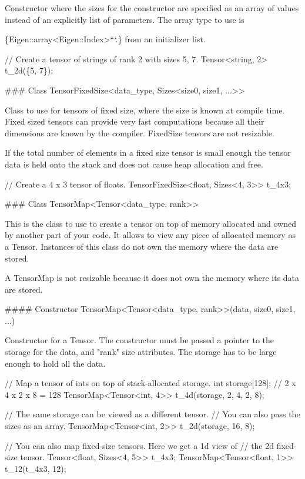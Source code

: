 Constructor where the sizes for the constructor are specified as an array of values instead of an explicitly list of parameters. The array type to use is 
\begin{DoxyCode}
\{Eigen::array<Eigen::Index>```.\}
from an initializer list.

    // Create a tensor of strings of rank 2 with sizes 5, 7.
    Tensor<string, 2> t\_2d(\{5, 7\});


### Class TensorFixedSize<data\_type, Sizes<size0, size1, ...>>

Class to use for tensors of fixed size, where the size is known at compile
time.  Fixed sized tensors can provide very fast computations because all their
dimensions are known by the compiler.  FixedSize tensors are not resizable.

If the total number of elements in a fixed size tensor is small enough the
tensor data is held onto the stack and does not cause heap allocation and free.

    // Create a 4 x 3 tensor of floats.
    TensorFixedSize<float, Sizes<4, 3>> t\_4x3;

### Class TensorMap<Tensor<data\_type, rank>>

This is the class to use to create a tensor on top of memory allocated and
owned by another part of your code.  It allows to view any piece of allocated
memory as a Tensor.  Instances of this class do not own the memory where the
data are stored.

A TensorMap is not resizable because it does not own the memory where its data
are stored.

#### Constructor TensorMap<Tensor<data\_type, rank>>(data, size0, size1, ...)

Constructor for a Tensor.  The constructor must be passed a pointer to the
storage for the data, and "rank" size attributes.  The storage has to be
large enough to hold all the data.

    // Map a tensor of ints on top of stack-allocated storage.
    int storage[128];  // 2 x 4 x 2 x 8 = 128
    TensorMap<Tensor<int, 4>> t\_4d(storage, 2, 4, 2, 8);

    // The same storage can be viewed as a different tensor.
    // You can also pass the sizes as an array.
    TensorMap<Tensor<int, 2>> t\_2d(storage, 16, 8);

    // You can also map fixed-size tensors.  Here we get a 1d view of
    // the 2d fixed-size tensor.
    Tensor<float, Sizes<4, 5>> t\_4x3;
    TensorMap<Tensor<float, 1>> t\_12(t\_4x3, 12);



\end{DoxyCode}
